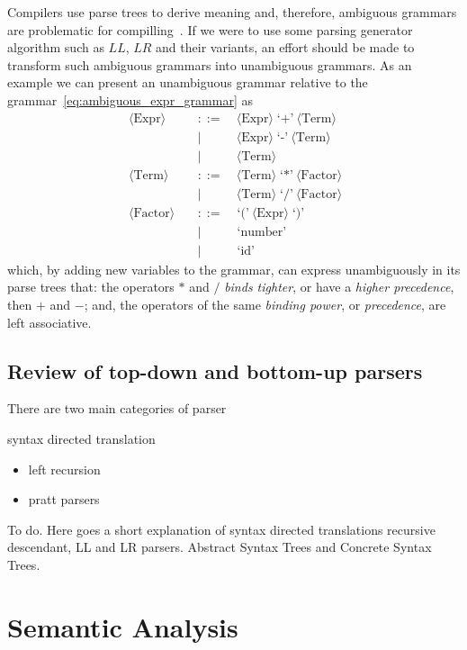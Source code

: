 \documentclass[
    oneside,
    english,
    coorientadorbanca,
    embeddedlogo,
    noabntexcite
]{ufsc-thesis-rn46-2019}
\newcommand{\bnfvar}[1]{\ \bnfvars{#1}}
\newcommand{\bnfvars}[1]{\langle\textrm{#1}\rangle}
\newcommand{\bnfter}[1]{\;\bnfters{#1}}
\newcommand{\bnfters}[1]{\textrm{`}\textrm{#1}\textrm{'}}
\newcommand{\bnfprod}[2]{\bnfvars{#1} &\ &::= & #2}
\newcommand{\bnfmore}[1]{ && \mid{} & #1}
\begin{document}
Compilers use parse trees to derive meaning and, therefore, ambiguous grammars are problematic for compilling~\cite{appel2003modern}.
If we were to use some parsing generator algorithm such as $LL$, $LR$ and their variants, an effort should be made to transform such ambiguous grammars into unambiguous grammars.
As an example we can present an unambiguous grammar relative to the grammar~\eqref{eq:ambiguous_expr_grammar} as
\begin{equation}~\label{eq:unambiguous_expr_grammar}
    \begin{alignedat}{2}
        \bnfprod{Expr}{\bnfvar{Expr} \bnfter{+} \bnfvar{Term}} \\
        \bnfmore{\bnfvar{Expr}\bnfter{-}\bnfvar{Term}} \\
        \bnfmore{\bnfvar{Term}} \\
        \bnfprod{Term}{\bnfvar{Term} \bnfter{*} \bnfvar{Factor}} \\
        \bnfmore{\bnfvar{Term}\bnfter{/}\bnfvar{Factor}} \\
        \bnfprod{Factor}{\bnfter{(}\bnfvar{Expr}\bnfter{)}} \\
        \bnfmore{\bnfter{number}} \\
        \bnfmore{\bnfter{id}}
    \end{alignedat}
\end{equation}
which, by adding new variables to the grammar, can express unambiguously in its parse trees that: the operators $*$ and $/$ \textit{binds tighter}, or have a \textit{higher precedence}, then $+$ and $-$; and, the operators of the same \textit{binding power}, or \textit{precedence}, are left associative.

\subsection{Review of top-down and bottom-up parsers}
There are two main categories of parser

syntax directed translation
\begin{itemize}
    \item left recursion
    \item pratt parsers
\end{itemize}

To do. Here goes a short explanation of syntax directed translations recursive descendant, LL and LR parsers. Abstract Syntax Trees and Concrete Syntax Trees.

\section{Semantic Analysis}\label{chapter:background:sec:semantic}
\end{document}
